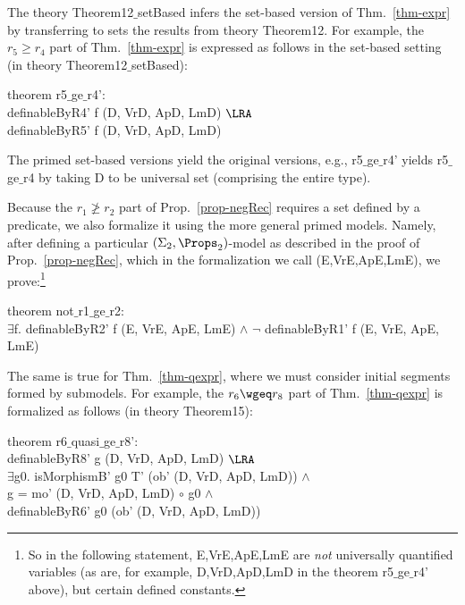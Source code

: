 The theory \textsf{Theorem12$\_$\allowbreak{}setBased} infers the set-based version of Thm.~\ref{thm-expr} by transferring to sets the results from theory \textsf{Theorem12}.  
For example, the $r_5 \geq r_4$ part of Thm.~\ref{thm-expr} 
is expressed as follows in the set-based setting (in theory \textsf{Theorem12$\_$\allowbreak{}setBased}): 

\medskip 
\noindent 
\textsf{
	theorem r5$\_$\allowbreak{}ge$\_$\allowbreak{}r4':
	\\\hspace*{3ex}definableByR4' f (D, VrD, ApD, LmD) $\LRA$
	\\\hspace*{3ex}definableByR5' f (D, VrD, ApD, LmD)
} 
\medskip 

The primed set-based versions yield the original versions, e.g., \textsf{r5$\_$\allowbreak{}ge$\_$\allowbreak{}r4'} yields \textsf{r5$\_$\allowbreak{}ge$\_$\allowbreak{}r4} by taking \textsf{D} to be universal set (comprising the entire type).  


Because the $r_1 \not\geq r_2$ part of Prop.~\ref{prop-negRec} requires a set defined by a predicate, 
we also formalize it using the more general primed models. Namely, after defining 
a particular $(\Sigma_2,\Props_2)$-model as described in the proof of Prop.~\ref{prop-negRec}, 
which in the formalization we call \textsf{(E,VrE,ApE,LmE)}, we prove:\footnote{So in the following statement, \textsf{E,VrE,ApE,LmE} are \emph{not} universally quantified variables (as are, for example, \textsf{D,VrD,ApD,LmD} in the theorem \textsf{r5$\_$\allowbreak{}ge$\_$\allowbreak{}r4'} above), but certain defined constants.}

\medskip 
\noindent 
\textsf{
	theorem not$\_$\allowbreak{}r1$\_$\allowbreak{}ge$\_$\allowbreak{}r2: 
	\\\hspace*{3ex}$\exists$f. definableByR2' f (E, VrE, ApE, LmE) $\wedge$ $\neg$ definableByR1' f (E, VrE, ApE, LmE)
}
\medskip 


The same is true for Thm.~\ref{thm-qexpr}, where we must consider initial segments formed by submodels.  For example, the 
$r_6\wgeq r_8$ part of Thm.~\ref{thm-qexpr} is formalized as follows (in theory \textsf{Theorem15}): 

\medskip 
\noindent 
\textsf{
theorem r6$\_$\allowbreak{}quasi$\_$\allowbreak{}ge$\_$\allowbreak{}r8':
\\\hspace*{3ex}definableByR8' g (D, VrD, ApD, LmD) $\LRA$  
\\\hspace*{3ex}$\exists$g0. isMorphismB' g0 T' (ob' (D, VrD, ApD, LmD)) $\wedge$ 
\\\hspace*{3ex}\phantom{$\exists$}
g = mo' (D, VrD, ApD, LmD) $\circ$ g0 $\wedge$
\\\hspace*{3ex}\phantom{$\exists$}
definableByR6' g0 (ob' (D, VrD, ApD, LmD))
}
\medskip 


